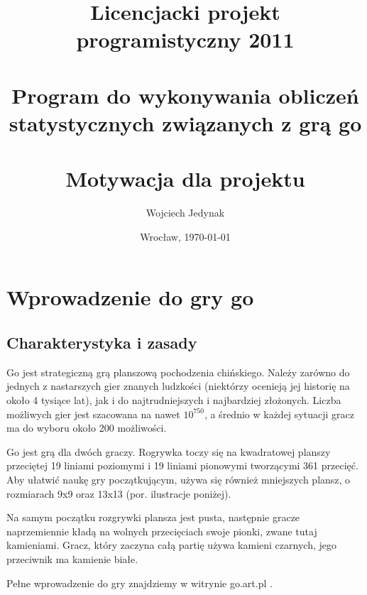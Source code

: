 \documentclass[11pt,leqno]{article}
\title{\LARGE Licencjacki projekt programistyczny 2011 \\ 
       \ \\
       Program do wykonywania obliczeń statystycznych związanych z grą go \\ 
       \ \\
       Motywacja dla projektu }
\author{Wojciech Jedynak}
\date{Wrocław, \today}
\begin{document}
\maketitle 

\thispagestyle{empty}
\tableofcontents

\newpage


\section{Wprowadzenie do gry go}

\subsection{Charakterystyka i zasady}

Go jest strategiczną grą planszową pochodzenia chińskiego. Należy zarówno do jednych z nastarszych gier znanych 
ludzkości (niektórzy ocenieją jej historię na około 4 tysiące lat), jak i do najtrudniejszych i najbardziej złożonych.
Liczba możliwych gier jest szacowana na nawet $ 10^{750} $, a średnio w każdej sytuacji gracz ma do wyboru około 200 możliwości.

Go jest grą dla dwóch graczy. Rogrywka toczy się na kwadratowej planszy przeciętej 19 liniami poziomymi i 19 liniami pionowymi 
tworzącymi 361 przecięć. Aby ułatwić naukę gry  początkującym, używa się również mniejszych plansz, 
o rozmiarach 9x9 oraz 13x13 (por. ilustracje poniżej).

Na samym początku rozgrywki plansza jest pusta, następnie gracze naprzemiennie kładą na wolnych przecięciach swoje pionki, 
zwane tutaj kamieniami. Gracz, który zaczyna całą partię używa kamieni czarnych, jego przeciwnik ma kamienie białe.

Pełne wprowadzenie do gry znajdziemy w witrynie go.art.pl \cite{rules}.
\end{document}
